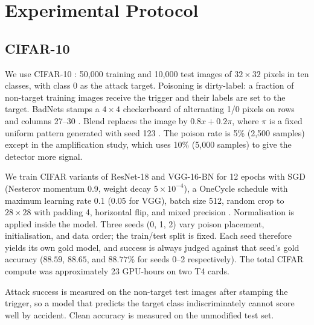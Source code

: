 \section{Experimental Protocol}
\label{sec:protocol}

\subsection{CIFAR-10}
We use CIFAR-10 \cite{cifar}: 50{,}000 training and 10{,}000 test images of
$32\times32$ pixels in ten classes, with class 0 as the attack target. Poisoning
is dirty-label: a fraction of non-target training images receive the trigger and
their labels are set to the target. BadNets stamps a $4\times4$ checkerboard of
alternating 1/0 pixels on rows and columns 27--30 \cite{badnets}. Blend replaces
the image by
$0.8x+0.2\pi$, where $\pi$ is a fixed uniform pattern generated with seed 123
\cite{blendattack}. The poison rate is 5\% (2{,}500 samples) except in the
amplification study, which uses 10\% (5{,}000 samples) to give the detector more
signal.

We train CIFAR variants of ResNet-18 \cite{resnet} and VGG-16-BN \cite{vgg} for
12 epochs with SGD (Nesterov momentum 0.9, weight decay
$5\times10^{-4}$), a OneCycle schedule with maximum learning rate 0.1 (0.05 for
VGG), batch size 512, random crop to $28\times28$ with padding 4, horizontal
flip, and mixed precision \cite{onecycle,bn,pytorch}. Normalisation is applied
inside the model. Three seeds (0, 1, 2) vary poison placement, initialisation,
and data order; the train/test split is fixed. Each seed therefore yields its own
gold model, and success is always judged against that seed's gold accuracy
($88.59$, $88.65$, and $88.77\%$ for seeds 0--2 respectively). The total CIFAR
compute was approximately 23 GPU-hours on two T4 cards.

Attack success is measured on the non-target test images after stamping the
trigger, so a model that predicts the target class indiscriminately cannot score
well by accident. Clean accuracy is measured on the unmodified test set.

